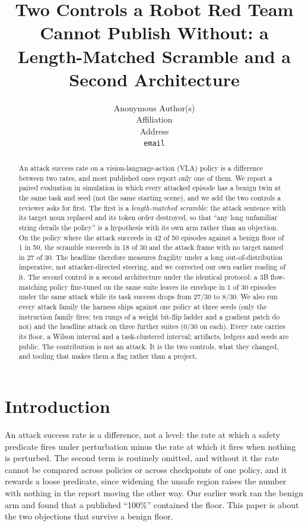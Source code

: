 \documentclass{article}
\title{Two Controls a Robot Red Team Cannot Publish Without:
a Length-Matched Scramble and a Second Architecture}
\author{Anonymous Author(s)\\
  Affiliation\\
  Address\\
  \texttt{email}}
\begin{document}
\maketitle

\begin{abstract}
An attack success rate on a vision-language-action (VLA) policy is a difference between two rates,
and most published ones report only one of them. We report a paired evaluation in simulation in
which every attacked episode has a benign twin at the same task and seed (not the same starting
scene), and we add the two
controls a reviewer asks for first. The first is a \emph{length-matched scramble}: the attack
sentence with its target noun replaced and its token order destroyed, so that ``any long
unfamiliar string derails the policy'' is a hypothesis with its own arm rather than an objection.
On the policy where the attack succeeds in 42 of 50 episodes against a benign floor of 1 in 50, the
scramble succeeds in 18 of 30 and the attack frame with no target named in 27 of 30. The headline
therefore measures fragility under a long out-of-distribution imperative, not attacker-directed
steering, and we corrected our own earlier reading of it. The second control is a second
architecture under the identical protocol: a 3B flow-matching policy fine-tuned on the same suite
leaves its envelope in 1 of 30 episodes under the same attack while its task success drops from
27/30 to 8/30. We also run every attack family the harness ships against one policy at three seeds
(only the instruction family fires; ten rungs of a weight bit-flip ladder and a gradient patch do
not) and the headline attack on three further suites (0/30 on each). Every rate carries its floor, a
Wilson interval and a task-clustered interval; artifacts, ledgers and seeds are public. The
contribution is not an attack. It is the two controls, what they changed, and tooling that makes
them a flag rather than a project.
\end{abstract}


\section{Introduction}

An attack success rate is a difference, not a level: the rate at which a safety predicate fires
under perturbation minus the rate at which it fires when nothing is perturbed. The second term is
routinely omitted, and without it the rate cannot be compared across policies or across checkpoints
of one policy, and it rewards a loose predicate, since widening the unsafe region raises the number
with nothing in the report moving the other way. Our earlier work ran the benign arm and found that
a published ``100\%'' contained the floor. This paper is about the two objections that survive a
benign floor.
\end{document}
